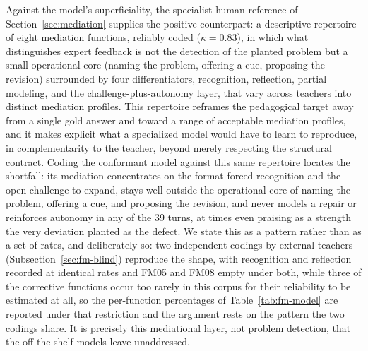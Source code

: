 \documentclass{sbc2023}%
\begin{document}
Against the model's superficiality, the specialist human reference of Section~\ref{sec:mediation} supplies the positive counterpart: a descriptive repertoire of eight mediation functions, reliably coded ($\kappa = 0.83$), in which what distinguishes expert feedback is not the detection of the planted problem but a small operational core (naming the problem, offering a cue, proposing the revision) surrounded by four differentiators, recognition, reflection, partial modeling, and the challenge-plus-autonomy layer, that vary across teachers into distinct mediation profiles. This repertoire reframes the pedagogical target away from a single gold answer and toward a range of acceptable mediation profiles, and it makes explicit what a specialized model would have to learn to reproduce, in complementarity to the teacher, beyond merely respecting the structural contract. Coding the conformant model against this same repertoire locates the shortfall: its mediation concentrates on the format-forced recognition and the open challenge to expand, stays well outside the operational core of naming the problem, offering a cue, and proposing the revision, and never models a repair or reinforces autonomy in any of the 39 turns, at times even praising as a strength the very deviation planted as the defect. We state this as a pattern rather than as a set of rates, and deliberately so: two independent codings by external teachers (Subsection~\ref{sec:fm-blind}) reproduce the shape, with recognition and reflection recorded at identical rates and FM05 and FM08 empty under both, while three of the corrective functions occur too rarely in this corpus for their reliability to be estimated at all, so the per-function percentages of Table~\ref{tab:fm-model} are reported under that restriction and the argument rests on the pattern the two codings share. It is precisely this mediational layer, not problem detection, that the off-the-shelf models leave unaddressed.
\end{document}
